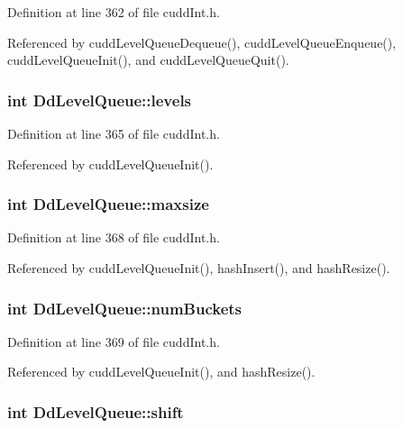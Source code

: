 Definition at line 362 of file cudd\-Int.h.

Referenced by cudd\-Level\-Queue\-Dequeue(), cudd\-Level\-Queue\-Enqueue(), cudd\-Level\-Queue\-Init(), and cudd\-Level\-Queue\-Quit().
\subsubsection{\setlength{\rightskip}{0pt plus 5cm}int \bf{Dd\-Level\-Queue::levels}}\label{structDdLevelQueue_ce6afbbffa148750c4158b7b4e0366ca}




Definition at line 365 of file cudd\-Int.h.

Referenced by cudd\-Level\-Queue\-Init().
\subsubsection{\setlength{\rightskip}{0pt plus 5cm}int \bf{Dd\-Level\-Queue::maxsize}}\label{structDdLevelQueue_cb7146e9f3dd73a052340c0e4010e6b6}




Definition at line 368 of file cudd\-Int.h.

Referenced by cudd\-Level\-Queue\-Init(), hash\-Insert(), and hash\-Resize().
\subsubsection{\setlength{\rightskip}{0pt plus 5cm}int \bf{Dd\-Level\-Queue::num\-Buckets}}\label{structDdLevelQueue_7d8e6f7c9adc1e662c568782f73cd222}




Definition at line 369 of file cudd\-Int.h.

Referenced by cudd\-Level\-Queue\-Init(), and hash\-Resize().
\subsubsection{\setlength{\rightskip}{0pt plus 5cm}int \bf{Dd\-Level\-Queue::shift}}\label{structDdLevelQueue_f39270cc5ce8832e2c6667a0b174803a}




